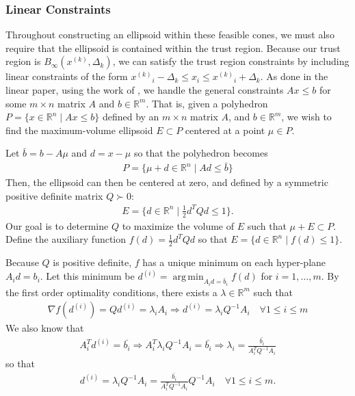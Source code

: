 \documentclass{article}
\theoremstyle{case}
\numberwithin{theorem}{subsection}
\DeclareMathOperator*{\argmin}{arg\,min}
\newcommand{\dk}{\Delta_k}
\newcommand{\gradf}{\nabla f}
\newcommand{\Rm}{\mathbb R^m}
\newcommand{\Rn}{\mathbb R^n}
\newcommand{\tr}{{ B_{\infty}\left(\xk, \dk\right) }}
\newcommand{\xk}{{x^{(k)}}}
\begin{document}
\subsubsection{Linear Constraints}

Throughout constructing an ellipsoid within these feasible cones, we must also require that the ellipsoid is contained within the trust region.
Because our trust region is $\tr$, we can satisfy the trust region constraints by including linear constraints of the form $\xk_i - \dk \le x_i \le \xk_i + \dk$.
As done in the linear paper, using the work of \cite{Khachiyan1993}, we handle the general constraints $Ax \le b$ for some $m\times n$ matrix $A$ and $b \in \Rm$.
That is, given a polyhedron $P = \{ x \in \Rn\; | \;  Ax \le b \}$ defined by an $m \times n$ matrix $A$, and $b \in \Rm$,
we wish to find the maximum-volume ellipsoid $E \subset P$ centered at a point $\mu \in P$.

Let $\bar{b} = b - A\mu$ and $d = x - \mu$ so that the polyhedron becomes
\begin{align*}
P = \{ \mu + d \in \Rn \; | \;  Ad \le \bar{b} \}
\end{align*}
Then, the ellipsoid can then be centered at zero, and defined by a symmetric positive definite matrix $Q \succ 0$:
\begin{align*}
E = \{ d \in \Rn \; | \; \frac 1 2 d^T Q d \le 1 \}.
\end{align*}
Our goal is to determine $Q$ to maximize the volume of $E$ such that $\mu + E \subset P$.
Define the auxiliary function $f(d) = \frac 1 2 d^T Q d$ so that $E = \{ d \in \Rn\; | \; f(d) \le 1 \}$.

Because $Q$ is positive definite, $f$ has a unique minimum on each hyper-plane $A_i d = b_i$.
Let this minimum be $d^{(i)} = \argmin_{A_id =\bar{b}_i} f(d)$ for $i=1,\ldots,m$.
By the first order optimality conditions, there exists a $\lambda \in \Rm$ such that
\begin{align*}
\gradf(d^{(i)}) = Q d^{(i)} = \lambda_i A_i 
\Longrightarrow d^{(i)} = \lambda_i Q^{-1}A_i \quad \forall 1\le i\le m
\end{align*}
We also know that
\begin{align*}
A_i^T d^{(i)} = \bar{b_i} \Longrightarrow
A_i^T \lambda_i Q^{-1}A_i = \bar{b_i} \Longrightarrow
\lambda_i = \frac {\bar{b_i}}{A_i^T  Q^{-1}A_i}
\end{align*}
so that
\begin{align*}
d^{(i)} = \lambda_i Q^{-1}A_i = \frac {\bar{b_i}}{A_i^T  Q^{-1}A_i}  Q^{-1}A_i \quad \forall 1\le i\le m.
\end{align*}
\end{document}
